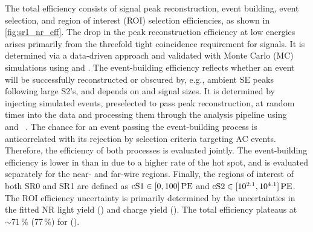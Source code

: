 \documentclass[
    reprint,
    superscriptaddress,
    aps, prl,
    amsmath,amssymb,
    twocolumn,
    showkeys,
    floatfix,
    nofootinbib,
]{revtex4-2}
\begin{document}
The total efficiency consists of signal peak reconstruction, event building, event selection, and region of interest (ROI) selection efficiencies, as shown in \cref{fig:sr1_nr_eff}.
The drop in the peak reconstruction efficiency at low energies arises primarily from the threefold tight coincidence requirement for \sone signals.
It is determined via a data-driven approach and validated with Monte Carlo (MC) simulations using  and  \cite{wfsim,fuse}.
The event-building efficiency reflects whether an event will be successfully reconstructed or obscured by, e.g., ambient SE peaks following large S2's, and depends on \sone and \stwo signal sizes.
It is determined by injecting simulated events, preselected to pass peak reconstruction, at random times into the data and processing them through the analysis pipeline using ~\cite{saltax} and ~\cite{axidence}.
The chance for an event passing the event-building process is anticorrelated with its rejection by selection criteria targeting AC events.
Therefore, the efficiency of both processes is evaluated jointly.
The event-building efficiency is lower in \sronea than in \sroneb due to a higher rate of the hot spot, and is evaluated separately for the near- and far-wire regions.
Finally, the regions of interest of both SR0 and SR1 are defined as $\mathrm{cS1}\in[0, 100]\,\mathrm{PE}$ and $\mathrm{cS2}\in[10^{2.1}, 10^{4.1}]\,\mathrm{PE}$.
The ROI efficiency uncertainty is primarily determined by the uncertainties in the fitted NR light yield (\lightyield) and charge yield (\chargeyield).
The total efficiency plateaus at $\sim71\,\%$ (77\,\%) for \sronea (\sroneb).
\end{document}
